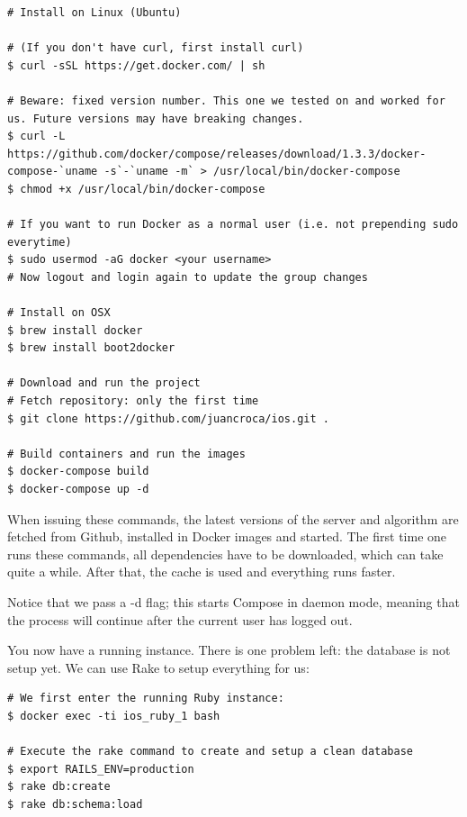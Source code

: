 \begin{verbatim}
# Install on Linux (Ubuntu)

# (If you don't have curl, first install curl)
$ curl -sSL https://get.docker.com/ | sh

# Beware: fixed version number. This one we tested on and worked for us. Future versions may have breaking changes.
$ curl -L https://github.com/docker/compose/releases/download/1.3.3/docker-compose-`uname -s`-`uname -m` > /usr/local/bin/docker-compose 
$ chmod +x /usr/local/bin/docker-compose

# If you want to run Docker as a normal user (i.e. not prepending sudo everytime)
$ sudo usermod -aG docker <your username>
# Now logout and login again to update the group changes

# Install on OSX
$ brew install docker
$ brew install boot2docker

# Download and run the project
# Fetch repository: only the first time
$ git clone https://github.com/juancroca/ios.git .

# Build containers and run the images
$ docker-compose build
$ docker-compose up -d
\end{verbatim}


When issuing these commands, the latest versions of the server and algorithm are fetched from Github, installed in Docker images and started. The first time one runs these commands, all dependencies have to be downloaded, which can take quite a while. After that, the cache is used and everything runs faster.

Notice that we pass a -d flag; this starts Compose in daemon mode, meaning that the process will continue after the current user has logged out.

You now have a running instance. There is one problem left: the database is not setup yet. We can use Rake to setup everything for us:

\begin{verbatim}
# We first enter the running Ruby instance:
$ docker exec -ti ios_ruby_1 bash

# Execute the rake command to create and setup a clean database
$ export RAILS_ENV=production
$ rake db:create
$ rake db:schema:load
\end{verbatim}

